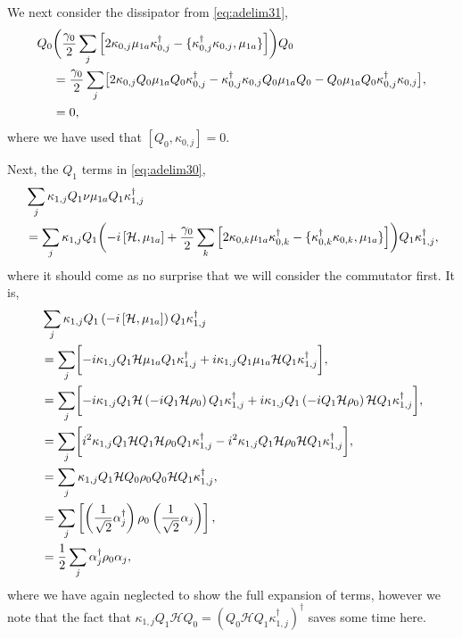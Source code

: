 We next consider the dissipator from \cref{eq:adelim31},
\begin{align}
	Q_{0}&\biggl( \frac{\gamma_{0}}{2} \sum_{j}\left[2\kappa_{0,j}\mu_{1a}\kappa_{0,j}^{\dagger} - \{\kappa_{0,j}^{\dagger}\kappa_{0,j}, \mu_{1a}\} \right] \biggr) Q_{0} \notag \\
	&= \frac{\gamma_{0}}{2} \sum_{j} \bigl[ 2\kappa_{0,j}Q_{0}\mu_{1a}Q_{0}\kappa_{0,j}^{\dagger} - \kappa_{0,j}^{\dagger}\kappa_{0,j}Q_{0}\mu_{1a}Q_{0} - Q_{0}\mu_{1a}Q_{0}\kappa_{0,j}^{\dagger}\kappa_{0,j} \bigr], \notag \\
	&= 0,
	\label{eq:adelim34}
\end{align}
where we have used that \([Q_{0}, \kappa_{0,j}] = 0\).

Next, the \(Q_{1}\) terms in \cref{eq:adelim30},
\begin{align}
	&\sum_{j} \kappa_{1,j}Q_{1}\nu\mu_{1a}Q_{1}\kappa_{1,j}^{\dagger} \notag \\
	&= \sum_{j}\kappa_{1,j}Q_{1}\biggl(-i\left[\mathcal{H},\mu_{1a}\right] + \frac{\gamma_{0}}{2} \sum_{k}\left[ 2\kappa_{0,k}\mu_{1a}\kappa_{0,k}^{\dagger} - \{\kappa_{0,k}^{\dagger}\kappa_{0,k}, \mu_{1a}\}\right] \biggr)Q_{1} \kappa_{1,j}^{\dagger},
	\label{eq:adelim35}
\end{align}
where it should come as no surprise that we will consider the commutator first. It is,
\begin{align}
	&\sum_{j} \kappa_{1,j}Q_{1}\left( -i\left[\mathcal{H},\mu_{1a}\right] \right)Q_{1}\kappa_{1,j}^{\dagger} \notag \\ 
	&= \sum_{j} \biggl[ -i\kappa_{1,j}Q_{1}\mathcal{H}\mu_{1a}Q_{1}\kappa_{1,j}^{\dagger} + i\kappa_{1,j}Q_{1}\mu_{1a}\mathcal{H}Q_{1}\kappa_{1,j}^{\dagger} \biggr], \notag \\
	&= \sum_{j} \biggl[ -i\kappa_{1,j}Q_{1}\mathcal{H}\left(-iQ_{1}\mathcal{H}\rho_{0}\right)Q_{1}\kappa_{1,j}^{\dagger} + i\kappa_{1,j}Q_{1}\left(-iQ_{1}\mathcal{H}\rho_{0}\right)\mathcal{H}Q_{1}\kappa_{1,j}^{\dagger} \biggr], \notag \\
	&= \sum_{j} \biggl[ i^{2}\kappa_{1,j}Q_{1}\mathcal{H}Q_{1}\mathcal{H}\rho_{0}Q_{1}\kappa_{1,j}^{\dagger} - i^{2}\kappa_{1,j}Q_{1}\mathcal{H}\rho_{0}\mathcal{H}Q_{1}\kappa_{1,j}^{\dagger} \biggr], \notag \\
	&= \sum_{j} \kappa_{1,j}Q_{1}\mathcal{H}Q_{0}\rho_{0}Q_{0}\mathcal{H}Q_{1}\kappa_{1,j}^{\dagger}, \notag \\
	&= \sum_{j}\left[ \left(\frac{1}{\sqrt{2}}\alpha_{j}^{\dagger}\right)\rho_{0}\left(\frac{1}{\sqrt{2}}\alpha_{j}\right)\right], \notag \\
	&= \frac{1}{2} \sum_{j} \alpha_{j}^{\dagger} \rho_{0} \alpha_{j},
	\label{eq:adelim36}
\end{align}
where we have again neglected to show the full expansion of terms, however we note that the fact that \(\kappa_{1,j}Q_{1}\mathcal{H}Q_{0} = (Q_{0}\mathcal{H}Q_{1}\kappa_{1,j}^{\dagger})^{\dagger}\) saves some time here.

